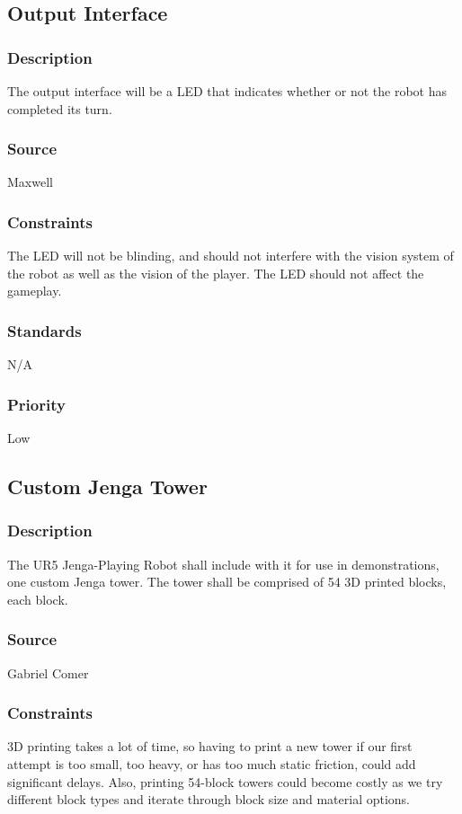 \subsection{Output Interface}
\subsubsection{Description}
The output interface will be a LED that indicates whether or not the robot has completed its turn.
\subsubsection{Source}
Maxwell
\subsubsection{Constraints}
The LED will not be blinding, and should not interfere with the vision system of the robot as well as the vision of the player. The LED should not affect the gameplay.
\subsubsection{Standards}
N/A
\subsubsection{Priority}
Low

\subsection{Custom Jenga Tower}
\subsubsection{Description}
The UR5 Jenga-Playing Robot shall include with it for use in demonstrations, one custom Jenga tower. The tower shall be comprised of 54 3D printed blocks, each block. 
\subsubsection{Source}
Gabriel Comer
\subsubsection{Constraints}
3D printing takes a lot of time, so having to print a new tower if our first attempt is too small, too heavy, or has too much static friction, could add significant delays. Also, printing 54-block towers could become costly as we try different block types and iterate through block size and material options.
